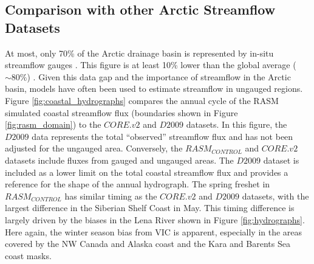 \documentclass[jgrga, draft]{agutex}
\begin{document}
\begin{article}
\subsection{Comparison with other Arctic Streamflow Datasets}
\label{sec:coastal_streamflow}

At most, only 70\% of the Arctic drainage basin is represented by in-situ streamflow gauges \citep{Shiklomanov_2000}.
This figure is at least 10\% lower than the global average ($\sim 80\%$) \citep{Dai_2009}.
Given this data gap and the importance of streamflow in the Arctic basin, models have often been used to estimate streamflow in ungauged regions.
Figure \ref{fig:coastal_hydrographs} compares the annual cycle of the RASM simulated coastal streamflow flux (boundaries shown in Figure \ref{fig:rasm_domain}) to the $CORE.v2$ and $D2009$ datasets.
In this figure, the $D2009$ data represents the total ``observed'' streamflow flux and has not been adjusted for the ungauged area.
Conversely, the $RASM_{CONTROL}$ and $CORE.v2$ datasets include fluxes from gauged and ungauged areas.
The $D2009$ dataset is included as a lower limit on the total coastal streamflow flux and provides a reference for the shape of the annual hydrograph.
The spring freshet in $RASM_{CONTROL}$ has similar timing as the $CORE.v2$ and $D2009$ datasets, with the largest difference in the Siberian Shelf Coast in May.
This timing difference is largely driven by the biases in the Lena River shown in Figure \ref{fig:hydrographs}.
Here again, the winter season bias from VIC is apparent, especially in the areas covered by the NW Canada and Alaska coast and the Kara and Barents Sea coast masks.


\end{article}
\end{document}
